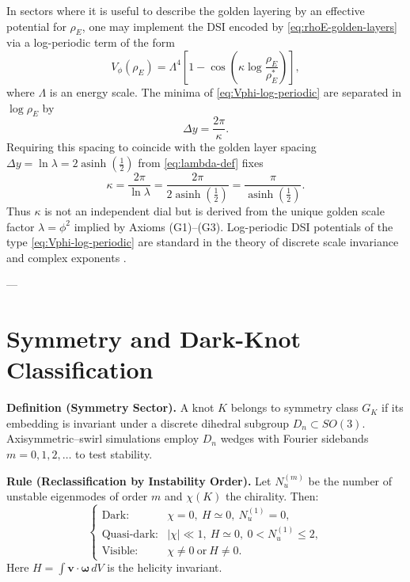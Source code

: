 \documentclass[10pt,reprint,aps,onecolumn,nofootinbib]{revtex4-2}
\newcommand{\rhoE}{\rho_{\!E}}                           %
\newcommand{\xig}{\operatorname{asinh}\!\left(\tfrac{1}{2}\right)}
\begin{document}
        In sectors where it is useful to describe the golden layering by an
        effective potential for $\rhoE$, one may implement the DSI encoded by
        \eqref{eq:rhoE-golden-layers} via a log-periodic term of the form
        \begin{equation}
            V_{\phi}(\rhoE)
            =
            \Lambda^4 \left[
                          1 - \cos\!\left(
                                        \kappa \log\frac{\rhoE}{\rhoE^{*}}
                \right)
            \right],
            \label{eq:Vphi-log-periodic}
        \end{equation}
        where $\Lambda$ is an energy scale. The minima of
        \eqref{eq:Vphi-log-periodic} are separated in $\log\rhoE$ by
        \begin{equation}
            \Delta y = \frac{2\pi}{\kappa}.
        \end{equation}
        Requiring this spacing to coincide with the golden layer spacing
        $\Delta y = \ln\lambda = 2\xig$ from \eqref{eq:lambda-def} fixes
        \begin{equation}
            \kappa = \frac{2\pi}{\ln\lambda}
            = \frac{2\pi}{2\xig}
            = \frac{\pi}{\xig}.
        \end{equation}
        Thus $\kappa$ is not an independent dial but is derived from the unique
        golden scale factor $\lambda=\phi^{2}$ implied by Axioms (G1)--(G3).
        Log-periodic DSI potentials of the type \eqref{eq:Vphi-log-periodic} are
        standard in the theory of discrete scale invariance and complex
        exponents \cite{Sornette1998,GluzmanSornette2002}.

        ---
    \section{Symmetry and Dark-Knot Classification}
    \label{sec:dark-knot}

    \textbf{Definition (Symmetry Sector).}
    A knot \(K\) belongs to symmetry class $G_K$
    if its embedding is invariant under a discrete dihedral subgroup
    $D_n\!\subset\!SO(3)$.
    Axisymmetric–swirl simulations employ
    $D_n$ wedges with Fourier sidebands $m\!=\!0,1,2,\dots$
    to test stability.

    \textbf{Rule (Reclassification by Instability Order).}
    Let \(N_u^{(m)}\) be the number of unstable eigenmodes of order \(m\)
    and \(\chi(K)\) the chirality.
    Then:
    \[
        \begin{cases}
            \text{Dark:} & \chi=0,\ H\simeq0,\ N_u^{(1)}=0,\\[3pt]
            \text{Quasi-dark:} & |\chi|\!\ll\!1,\ H\simeq0,\ 0<N_u^{(1)}\!\le\!2,\\[3pt]
            \text{Visible:} & \chi\neq0\ \text{or}\ H\neq0.
        \end{cases}
    \]
    Here \(H=\int\mathbf{v}\!\cdot\!\boldsymbol{\omega}\,dV\) is the helicity invariant.
\end{document}
